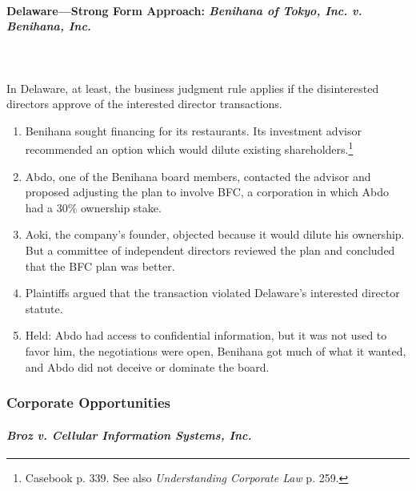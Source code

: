 \paragraph{Delaware---Strong Form Approach: \emph{Benihana of Tokyo, Inc. v. 
Benihana, Inc.}}
~\\\\
In Delaware, at least, the business judgment rule applies if the disinterested 
directors approve of the interested director transactions.

\begin{enumerate}
    \item Benihana sought financing for its restaurants. Its investment advisor 
    recommended an option which would dilute existing 
    shareholders.\footnote{Casebook p. 339. See also \emph{Understanding 
    Corporate Law} p. 259.}
    \item Abdo, one of the Benihana board members, contacted the advisor and 
    proposed adjusting the plan to involve BFC, a corporation in which Abdo had 
    a 30\% ownership stake.
    \item Aoki, the company's founder, objected because it would dilute his 
    ownership. But a committee of independent directors reviewed the plan and 
    concluded that the BFC plan was better.
    \item Plaintiffs argued that the transaction violated Delaware's interested 
    director statute.
    \item Held: Abdo had access to confidential information, but it was not used 
    to favor him, the negotiations were open, Benihana got much of what it 
    wanted, and Abdo did not deceive or dominate the board.
\end{enumerate}

\subsubsection{Corporate Opportunities}

\paragraph{\emph{Broz v. Cellular Information Systems, Inc.}}

